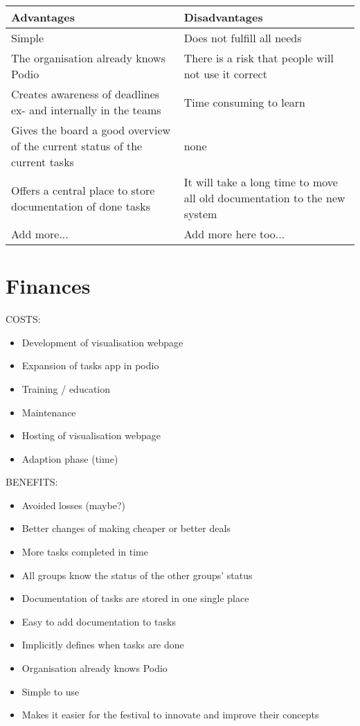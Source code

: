 \begin{center}
    \begin{tabular}{ | p{7cm} | p{7cm} |}
    \hline
    \textbf{Advantages} & \textbf{Disadvantages}  \\ \hline
    Simple & Does not fulfill all needs  \\ \hline
    The organisation already knows Podio & There is a risk that people will not use it correct \\
    \hline
    Creates awareness of deadlines ex- and internally in the teams & Time consuming to learn \\ \hline
    Gives the board a good overview of the current status of the current tasks & none \\ \hline
    Offers a central place to store documentation of done tasks & It will take a long time to move
    all old documentation to the new system \\ \hline
    Add more... & Add more here too... \\ 
    \hline
    \end{tabular}
\end{center}


\section{Finances}

COSTS:
\begin{itemize}
    \item Development of visualisation webpage
    \item Expansion of tasks app in podio
    \item Training / education
    \item Maintenance
    \item Hosting of visualisation webpage
    \item Adaption phase (time)
\end{itemize}

BENEFITS:
\begin{itemize}
    \item Avoided losses (maybe?)
    \item Better changes of making cheaper or better deals
    \item More tasks completed in time
    \item All groups know the status of the other groups' status
    \item Documentation of tasks are stored in one single place
    \item Easy to add documentation to tasks
    \item Implicitly defines when tasks are done
    \item Organisation already knows Podio
    \item Simple to use
    \item Makes it easier for the festival to innovate and improve their concepts
\end{itemize}

